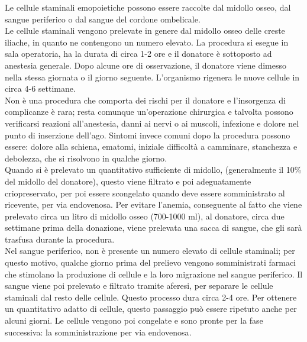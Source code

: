 Le cellule staminali emopoietiche possono essere raccolte dal midollo osseo, dal sangue periferico o dal sangue del 
cordone ombelicale.\\ 
Le cellule staminali vengono prelevate in genere dal midollo osseo delle creste iliache, in quanto ne contengono un 
numero elevato. La procedura si esegue in sala operatoria, ha la durata di circa 1-2 ore e il donatore è sottoposto 
ad anestesia generale. Dopo alcune ore di osservazione, il donatore viene dimesso nella stessa giornata
o il giorno seguente. L’organismo rigenera le nuove cellule in circa 4-6 settimane\cite{STEMCELLS}.\\ 
Non è una procedura che comporta dei rischi per il donatore e l’insorgenza di complicanze è rara; resta comunque 
un’operazione chirurgica e talvolta possono verificarsi reazioni all’anestesia, danni ai 
nervi o ai muscoli, infezione e dolore nel punto di inserzione dell’ago. 
Sintomi invece comuni dopo la procedura possono essere: dolore alla schiena, ematomi, iniziale difficoltà a camminare, 
stanchezza e debolezza, che si risolvono in qualche giorno\cite{STEMCELLS}.\\ 
Quando si è prelevato un quantitativo sufficiente di midollo, (generalmente il 10\% del midollo del donatore), 
questo viene filtrato e poi adeguatamente criopreservato, per poi essere scongelato quando deve essere somministrato 
al ricevente, per via endovenosa\cite{STEMCELLS}.
Per evitare l’anemia, conseguente al fatto che viene prelevato circa un litro di midollo osseo 
(700-1000 ml), al donatore, circa due settimane prima della donazione, viene prelevata una sacca di sangue, 
che gli sarà trasfusa durante la procedura\cite{TRAPIANTO}.\\

Nel sangue periferico, non è presente un numero elevato di cellule staminali; per questo motivo, qualche 
giorno prima del prelievo vengono somministrati farmaci che stimolano la produzione di cellule e la loro 
migrazione nel sangue periferico. Il sangue viene poi prelevato e filtrato tramite aferesi, per separare le cellule 
staminali dal resto delle cellule. Questo  processo dura circa 2-4 ore. Per ottenere un quantitativo adatto di cellule,
questo passaggio può essere ripetuto anche per alcuni giorni. 
Le cellule vengono poi congelate e sono pronte per la fase successiva: la somministrazione per via endovenosa\cite{STEMCELLS}.\\

